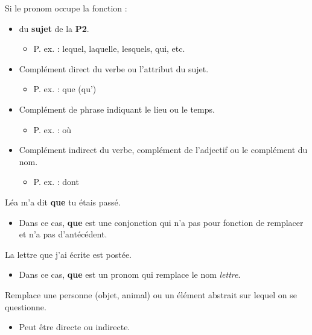 \documentclass[10pt, french]{article}
\begin{document}
\begin{multicols*}{2}
\begin{definitionNOHFILLsub}
Si le pronom occupe la fonction :
\begin{itemize}
	\item	du \textbf{sujet} de la \textbf{P2}.
		\begin{itemize}
		\item	P. ex. : lequel, laquelle, lesquels, qui, etc.
		\end{itemize}
	\item	Complément direct du verbe ou l'attribut du sujet.
		\begin{itemize}
		\item	P. ex. : que (qu')
		\end{itemize}
	\item	Complément de phrase indiquant le lieu ou le temps.
		\begin{itemize}
		\item	P. ex. : où
		\end{itemize}
	\item	Complément indirect du verbe, complément de l'adjectif ou le complément du nom.
		\begin{itemize}
		\item	P. ex. : dont
		\end{itemize}
\end{itemize}
\end{definitionNOHFILLsub}

\begin{astuces}
Léa m'a dit \textbf{que} tu étais passé.
\begin{itemize}
	\item	Dans ce cas, \textbf{que} est une conjonction qui n'a pas pour fonction de remplacer et n'a pas d'antécédent.
\end{itemize}

La lettre que j'ai écrite est postée.
\begin{itemize}
	\item	Dans ce cas, \textbf{que} est un pronom qui remplace le nom \textit{lettre}.
\end{itemize}
\end{astuces}

\begin{definitionNOHFILLsub}
Remplace une personne (objet, animal) ou un élément abstrait sur lequel on se questionne.
\begin{itemize}
	\item	Peut être directe ou indirecte.
\end{itemize}


\end{definitionNOHFILLsub}
\end{multicols*}
\end{document}
